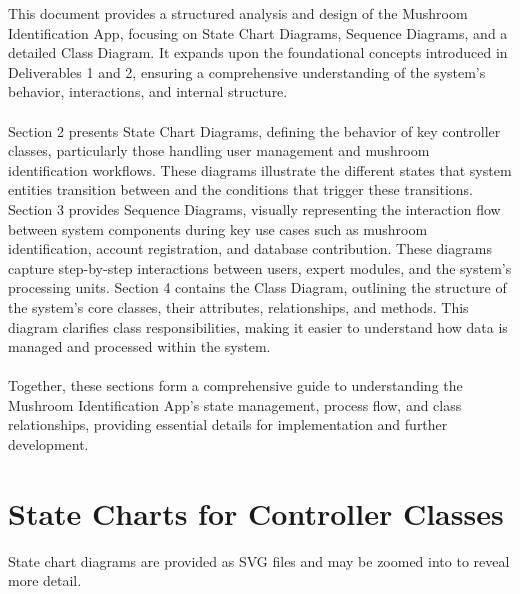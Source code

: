\documentclass[]{article}
\begin{document}
This document provides a structured analysis and design of the Mushroom Identification App, focusing on State Chart Diagrams, Sequence Diagrams, and a detailed Class Diagram. It expands upon the foundational concepts introduced in Deliverables 1 and 2, ensuring a comprehensive understanding of the system’s behavior, interactions, and internal structure.  \\ \\
Section 2 presents State Chart Diagrams, defining the behavior of key controller classes, particularly those handling user management and mushroom identification workflows. These diagrams illustrate the different states that system entities transition between and the conditions that trigger these transitions. 
Section 3 provides Sequence Diagrams, visually representing the interaction flow between system components during key use cases such as mushroom identification, account registration, and database contribution. These diagrams capture step-by-step interactions between users, expert modules, and the system’s processing units. 
Section 4 contains the Class Diagram, outlining the structure of the system’s core classes, their attributes, relationships, and methods. This diagram clarifies class responsibilities, making it easier to understand how data is managed and processed within the system.  \\ \\
Together, these sections form a comprehensive guide to understanding the Mushroom Identification App’s state management, process flow, and class relationships, providing essential details for implementation and further development.



\newpage

\section{State Charts for Controller Classes}

State chart diagrams are provided as SVG files and may be zoomed into to reveal more detail.
\label{sec:state_charts_for_controller_classes}
\end{document}
